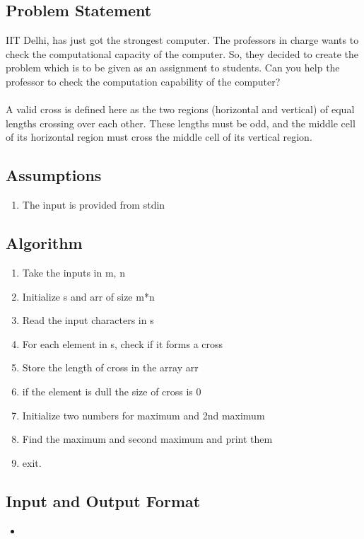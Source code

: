 \documentclass[12pt]{article}
\begin{document}
{
\subsection{Problem Statement}
IIT Delhi, has just got the strongest computer. The professors in charge wants to check the computational capacity of the computer. So, they decided to create the problem which is to be given as an assignment to students. Can you help the professor to check the computation capability of the computer?
\\ \\
A valid cross is defined here as the two regions (horizontal and vertical) of equal lengths crossing over each other. These lengths must be odd, and the middle cell of its horizontal region must cross the middle cell of its vertical region.
\cite{ref1}

\subsection{Assumptions}
{
\begin{enumerate}
\item The input is provided from stdin
\\
\end{enumerate}
}

\subsection{Algorithm}
{
\begin{enumerate}
\item Take the inputs in m, n
\item Initialize s and arr of size m*n
\item Read the input characters in s
\item For each element in s, check if it forms a cross
\item Store the length of cross in the array arr
\item if the element is dull the size of cross is 0
\item Initialize two numbers for maximum and 2nd maximum
\item Find the maximum and second maximum and print them
\item exit.
\end{enumerate} 
}


\subsection{Input and Output Format}
{
\begin{itemize}
\item 


\end{itemize}}}
\end{document}
